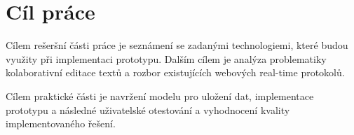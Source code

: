 
\chapter{Cíl práce}

Cílem rešeršní části práce je seznámení se zadanými technologiemi, které budou využity při implementaci prototypu.
Dalším cílem je analýza problematiky kolaborativní editace textů a rozbor existujících webových real-time protokolů.



Cílem praktické části je navržení modelu pro uložení dat, implementace prototypu a následné uživatelské otestování a vyhodnocení kvality implementovaného řešení.


